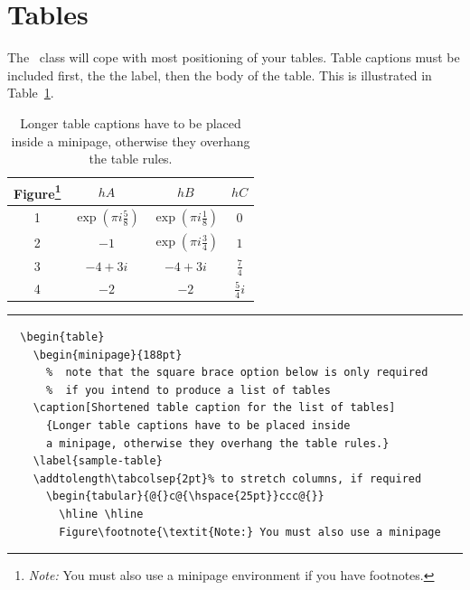 \section{Tables}

The \cambridge\ class will cope with most positioning of your tables. Table captions must be included first, the the label, then the body of the table. This is illustrated in Table~\ref{sample-table}.
  \begin{table}
    \begin{minipage}{188pt}
    \caption[Shortened table caption for the list of tables]
      {Longer table captions have to be placed inside
      a minipage, otherwise they overhang the table rules.}
    \label{sample-table}
    \addtolength\tabcolsep{2pt}%
      \begin{tabular}{@{}c@{\hspace{25pt}}ccc@{}}
        \hline \hline
        Figure\footnote{\textit{Note:} You must also use a minipage
          environment if you have footnotes.} & $hA$ & $hB$ & $hC$\\
        \hline
        1 & $\exp\left(\pi i\frac58\right)$
          & $\exp\left(\pi i\frac18\right)$ & $0$\\[3pt]
        2 & $-1$    & $\exp\left(\pi i\frac34\right)$ & $1$\\[11pt]
        3 & $-4+3i$ & $-4+3i$ & $\frac74$\\[3pt]
        4 & $-2$    & $-2$    & $\frac54 i$ \\
        \hline \hline
      \end{tabular}
    \end{minipage}
    \rule[-20pt]{\textwidth}{0.5pt}
\begin{verbatim}
  \begin{table}
    \begin{minipage}{188pt}
      %  note that the square brace option below is only required
      %  if you intend to produce a list of tables
    \caption[Shortened table caption for the list of tables]
      {Longer table captions have to be placed inside
      a minipage, otherwise they overhang the table rules.}
    \label{sample-table}
    \addtolength\tabcolsep{2pt}% to stretch columns, if required
      \begin{tabular}{@{}c@{\hspace{25pt}}ccc@{}}
        \hline \hline
        Figure\footnote{\textit{Note:} You must also use a minipage

\end{verbatim}
\end{table}
